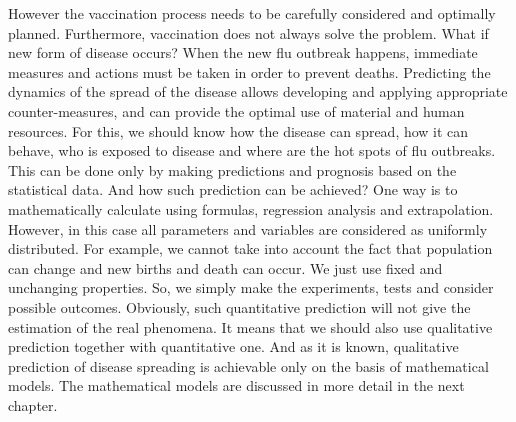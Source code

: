 However the vaccination process needs to be carefully considered and optimally planned. Furthermore, vaccination does not always solve the problem. What if new form of disease occurs? When the new flu outbreak happens, immediate measures and actions must be taken in order to prevent deaths. Predicting the dynamics of the spread of the disease allows developing and applying appropriate counter-measures, and can provide the optimal use of material and human resources.  For this, we should know how the disease can spread, how it can behave, who is exposed to disease and where are the hot spots of flu outbreaks. This can be done only by making predictions and prognosis based on the statistical data. And how such prediction can be achieved? One way is to mathematically calculate using formulas, regression analysis and extrapolation. However, in this case all parameters and variables are considered as uniformly distributed. For example, we cannot take into account the fact that population can change and new births and death can occur. We just use fixed and unchanging properties. So, we simply make the experiments, tests and consider possible outcomes. Obviously, such quantitative prediction will not give the estimation of the real phenomena. It means that we should also use qualitative prediction together with quantitative one. And as it is known, qualitative prediction of disease spreading is achievable only on the basis of mathematical models. The mathematical models are discussed in more detail in the next chapter.